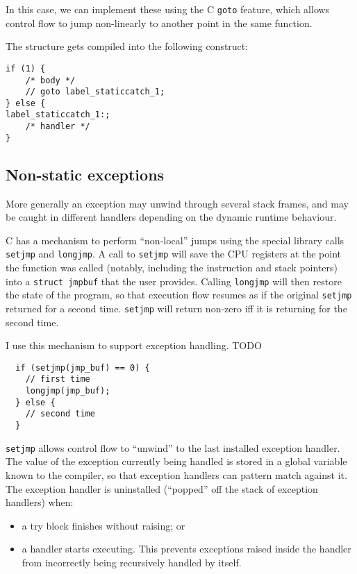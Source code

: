 \documentclass[12pt,a4paper,twoside,openright]{report}
\begin{document}
In this case, we can implement these using the C \lstinline!goto! feature,
which allows control flow to jump non-linearly to another point in the same
function.

The structure gets compiled into the following construct:

\begin{lstlisting}
if (1) {
    /* body */
    // goto label_staticcatch_1;
} else {
label_staticcatch_1:;
    /* handler */
}
\end{lstlisting}

\subsection{Non-static exceptions}

More generally an exception may unwind through several stack frames, and may be
caught in different handlers depending on the dynamic runtime behaviour.

C has a mechanism to perform ``non-local'' jumps using the special library
calls \lstinline!setjmp! and \lstinline!longjmp!. A call to \lstinline!setjmp!
will save the CPU registers at the point the function was called (notably,
including the instruction and stack pointers) into a \lstinline!struct jmpbuf!
that the user provides. Calling \lstinline!longjmp! will then restore the state
of the program, so that execution flow resumes as if the original
\lstinline!setjmp! returned for a second time. \lstinline!setjmp! will return
non-zero iff it is returning for the second time.

I use this mechanism to support exception handling. TODO

\begin{lstlisting}
  if (setjmp(jmp_buf) == 0) {
    // first time
    longjmp(jmp_buf);
  } else {
    // second time
  }
\end{lstlisting}

\lstinline!setjmp! allows control flow to ``unwind'' to the last installed
exception handler. The value of the exception currently being handled is stored
in a global variable known to the compiler, so that exception handlers can
pattern match against it. The exception handler is uninstalled (``popped'' off
the stack of exception handlers) when:
\begin{itemize}
  \item a try block finishes without raising; or
  \item a handler starts executing. This prevents exceptions raised inside the
      handler from incorrectly being recursively handled by itself.
\end{itemize}
\end{document}
